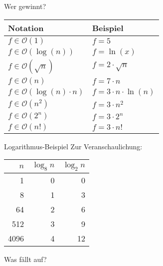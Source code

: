 \begin{frame}{Wer gewinnt?}
    \begin{table}
        \centering
        \begin{tabular}{ll}
            \toprule
            Notation & Beispiel\\
            \midrule
            $f \in \mathcal{O}\left( 1 \right)$ & $f = 5$\\
            $f \in \mathcal{O}\left( \log\left( n\right) \right)$ & $f = \ln\left( x \right)$\\
            $f \in \mathcal{O}\left( \sqrt{n} \right)$ & $f= 2\cdot \sqrt{n}$\\
            $f \in \mathcal{O}\left( n \right)$ & $f = 7\cdot n$\\
            $f \in \mathcal{O}\left( \log\left( n \right)\cdot n \right)$ & $f = 3\cdot n\cdot \ln\left( n \right)$\\
            $f \in \mathcal{O}\left( n^2 \right)$ & $f = 3\cdot n^2$\\
            $f \in \mathcal{O}\left( 2^n \right)$ & $f = 3\cdot 2^n$\\
            $f \in \mathcal{O}\left( n! \right)$ & $f = 3\cdot n!$\\
            \bottomrule
        \end{tabular}
    \end{table}
\end{frame}
\begin{frame}{Logarithmus-Beispiel}
    Zur Veranschaulichung:
    \begin{table}
        \centering
        \begin{tabular}{rrr}
            \toprule
            $n$ & $\log_8 n$ & $\log_2 n$\\
            \midrule
            1 & 0 & 0 \\
            8 & 1 & 3 \\
            64 & 2 & 6\\
            512 & 3 & 9 \\
            4096 & 4 & 12 \\
            \bottomrule
        \end{tabular}
    \end{table}
    Was fällt auf?\\
\end{frame}
